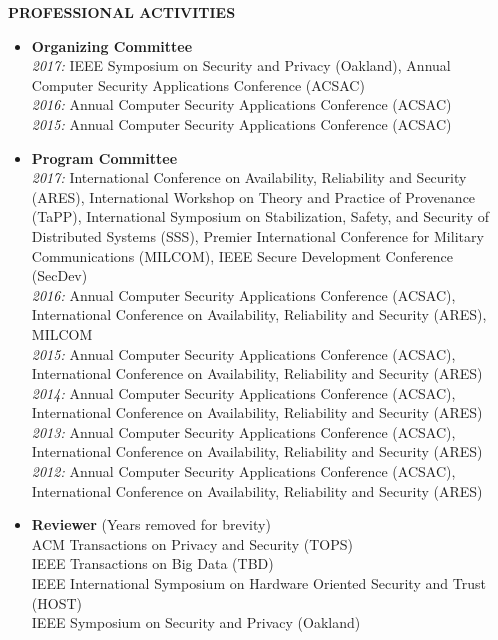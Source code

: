 \documentclass[10pt]{article}
\begin{document}
\vspace{1em} {\Large \textbf{PROFESSIONAL ACTIVITIES}}
\begin{itemize}
  \item \textbf{Organizing Committee}\\
    \textit{2017:} IEEE Symposium on Security and Privacy (Oakland), Annual Computer Security Applications Conference (ACSAC)\\
    \textit{2016:} Annual Computer Security Applications Conference (ACSAC)\\
    \textit{2015:} Annual Computer Security Applications Conference (ACSAC)
  \item \textbf{Program Committee}\\
    \textit{2017:} International Conference on Availability, Reliability and Security (ARES), International Workshop on Theory and Practice of Provenance (TaPP), International Symposium on Stabilization, Safety, and Security of Distributed Systems (SSS), Premier International Conference for Military Communications (MILCOM), IEEE Secure Development Conference (SecDev)\\
    \textit{2016:} Annual Computer Security Applications Conference (ACSAC), International Conference on Availability, Reliability and Security (ARES), MILCOM\\
    \textit{2015:} Annual Computer Security Applications Conference (ACSAC), International Conference on Availability, Reliability and Security (ARES)\\
    \textit{2014:} Annual Computer Security Applications Conference (ACSAC), International Conference on Availability, Reliability and Security (ARES)\\
    \textit{2013:} Annual Computer Security Applications Conference (ACSAC), International Conference on Availability, Reliability and Security (ARES)\\
    \textit{2012:} Annual Computer Security Applications Conference (ACSAC), International Conference on Availability, Reliability and Security (ARES)\\
  \item \textbf{Reviewer} (Years removed for brevity)\\
    ACM Transactions on Privacy and Security (TOPS)\\
    IEEE Transactions on Big Data (TBD)\\
    IEEE International Symposium on Hardware Oriented Security and Trust (HOST)\\
    IEEE Symposium on Security and Privacy (Oakland)\\

\end{itemize}
\end{document}
